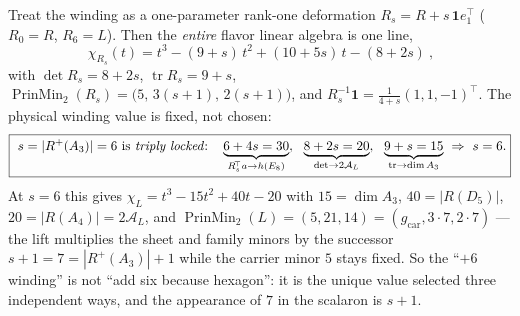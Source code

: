 \documentclass[11pt,a4paper]{article}
\newcommand{\gcar}{g_{\mathrm{car}}}
\theoremstyle{definition}
\begin{document}
\begin{keybox}
Treat the winding as a one-parameter rank-one deformation $R_s=R+s\,\mathbf1 e_1^{\!\top}$ ($R_0=R$,
$R_6=L$). Then the \emph{entire} flavor linear algebra is one line,
\[
  \boxed{\ \chi_{R_s}(t)=t^3-(9+s)\,t^2+(10+5s)\,t-(8+2s)\ },
\]
with $\det R_s=8+2s$, $\operatorname{tr}R_s=9+s$,
$\operatorname{PrinMin}_2(R_s)=\bigl(5,\,3(s{+}1),\,2(s{+}1)\bigr)$, and
$R_s^{-1}\mathbf1=\tfrac1{4+s}(1,1,-1)^{\!\top}$. The physical winding value is fixed, not chosen:
\[
  \boxed{\ s=|R^+(A_3)|=6\ \text{is \emph{triply locked}:}\quad
  \underbrace{6+4s=30}_{R_s^{\!\top}a\to h(E_8)},\ \ \underbrace{8+2s=20}_{\det\to2\mathcal A_L},\ \
  \underbrace{9+s=15}_{\operatorname{tr}\to\dim A_3}\ \Rightarrow\ s=6 .}
\]
At $s=6$ this gives $\chi_L=t^3-15t^2+40t-20$ with $15=\dim A_3$, $40=|R(D_5)|$, $20=|R(A_4)|=2\mathcal A_L$,
and $\operatorname{PrinMin}_2(L)=(5,21,14)=(\gcar,3{\cdot}7,2{\cdot}7)$ --- the lift multiplies the sheet
and family minors by the successor $s{+}1=7=|R^+(A_3)|{+}1$ while the carrier minor $5$ stays fixed. So the
``$+6$ winding'' is not ``add six because hexagon'': it is the unique value selected three independent
ways, and the appearance of $7$ in the scalaron is $s{+}1$.
\end{keybox}
\end{document}
